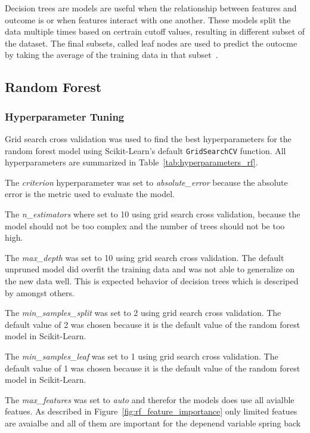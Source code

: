 Decision trees are models are useful when the relationship between features and outcome is
or when features interact with one another.
These models split the data multiple times based on certrain cutoff values, resulting in
different subset of the dataset.
The final subsets, called leaf nodes are used to predict the outocme by taking the average of the
training data in that subset~\cite[p. 76]{molnar2020interpretable}.

\subsection{Random Forest}\label{subsec:random-forest}

\subsubsection*{Hyperparameter Tuning}
Grid search cross validation was used to find the best hyperparameters for the random forest
model using
Scikit-Learn's default \texttt{GridSearchCV} function.
All hyperparameters are summarized in Table~\ref{tab:hyperparameters_rf}.

The \textit{criterion} hyperparameter was set to \textit{absolute\_error} because the absolute
error is the metric
used to evaluate the model.

The \textit{n\_estimators} where set to 10 using grid search cross validation, because the model
should not be too
complex and the number of trees should not be too high.

The \textit{max\_depth} was set to 10 using grid search cross validation. The default unpruned
model did overfit the
training data and was not able to generalize on the new data well. This is expected behavior of
decision trees which
is descriped by \cite[p. 133-136]{muller_introductionmachinelearning_2016} amongst others.

The \textit{min\_samples\_split} was set to 2 using grid search cross validation. The default
value of 2 was chosen
because it is the default value of the random forest model in Scikit-Learn.

The \textit{min\_samples\_leaf} was set to 1 using grid search cross validation. The default
value of 1 was chosen
because it is the default value of the random forest model in Scikit-Learn.

The \textit{max\_features} was set to \textit{auto} and therefor the models does use all avialble
featues. As
described in Figure~\ref{fig:rf_feature_importance} only limited featues are avaialbe and all of
them are important
for the depenend variable spring back

